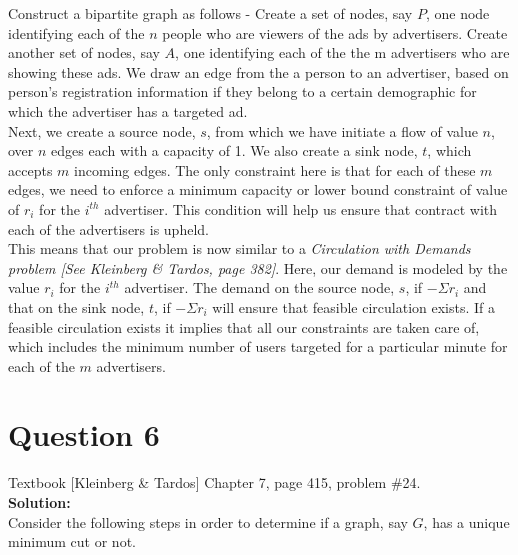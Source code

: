 \documentclass[11pt]{article}
\begin{document}
Construct a bipartite graph as follows - Create a set of nodes, say $ P $, one node identifying each of the $ n $ people who are viewers of the ads by advertisers. Create another set of nodes, say $ A $, one identifying each of the the m advertisers who are showing these ads. We draw an edge from the a person to an advertiser, based on person's registration information if they belong to a certain demographic for which the advertiser has a targeted ad. \\

Next, we create a source node, $ s $, from which we have initiate a flow of value $ n $, over $ n $ edges each with a capacity of 1. We also create a sink node, $ t $, which accepts $ m $ incoming edges. The only constraint here is that for each of these $ m $ edges, we need to enforce a minimum capacity or lower bound constraint of value of $ r_i $ for the $ i^{th} $ advertiser. This condition will help us ensure that contract with each of the advertisers is upheld. \\

This means that our problem is now similar to a \textit{Circulation with Demands problem [See Kleinberg \& Tardos, page 382]}. Here, our demand is modeled by the value $ r_i $ for the $ i^{th} $ advertiser.
The demand on the source node, $ s $, if $ -\Sigma r_i $ and that on the sink node, $ t $, if $ -\Sigma r_i $ will ensure that feasible circulation exists. If a feasible circulation exists it implies that all our constraints are taken care of, which includes the minimum number of users targeted for a particular minute for each of the $ m $ advertisers.

\clearpage
\section{Question 6} Textbook [Kleinberg \& Tardos] Chapter 7, page 415, problem \#24. \\
\textbf{Solution:} \\

Consider the following steps in order to determine if a graph, say $ G $, has a unique minimum cut or not.
\end{document}
